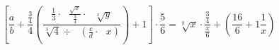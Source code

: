 \documentclass[11pt,a4paper]{book}
\begin{document}
$$
\left[\frac{a}{b}+\frac{\frac{3}{4}}{4}\left(\frac{\frac{1}{3}\cdot \:\:\:\frac{\sqrt{x}}{\frac{3}{4}}\cdot \:\:\:\sqrt[x]{y}}{\sqrt[3]{4}\div \:\:\:\left(\frac{c}{d}\cdot \:\:\:x\right)}\right)+1\right]\cdot \frac{5}{6}=\sqrt[y]{x}\cdot \frac{\frac{3}{4}}{\frac{x}{6}}+\left(\frac{16}{6}+1\frac{1}{x}\right)
$$
\end{document}
